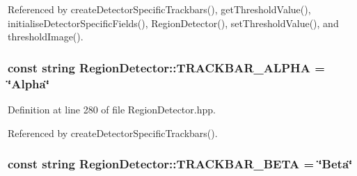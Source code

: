 \-Referenced by create\-Detector\-Specific\-Trackbars(), get\-Threshold\-Value(), initialise\-Detector\-Specific\-Fields(), \-Region\-Detector(), set\-Threshold\-Value(), and threshold\-Image().

\hypertarget{classmultiscale_1_1analysis_1_1RegionDetector_a5513e029d4d4cf249aa40364489f7a85}{
\subsubsection[{\-T\-R\-A\-C\-K\-B\-A\-R\-\_\-\-A\-L\-P\-H\-A}]{\setlength{\rightskip}{0pt plus 5cm}const string {\bf \-Region\-Detector\-::\-T\-R\-A\-C\-K\-B\-A\-R\-\_\-\-A\-L\-P\-H\-A} = \char`\"{}\-Alpha\char`\"{}}}\label{classmultiscale_1_1analysis_1_1RegionDetector_a5513e029d4d4cf249aa40364489f7a85}


\-Definition at line 280 of file \-Region\-Detector.\-hpp.



\-Referenced by create\-Detector\-Specific\-Trackbars().

\hypertarget{classmultiscale_1_1analysis_1_1RegionDetector_a79d7878ed55bf12a87637896a1f44e37}{
\subsubsection[{\-T\-R\-A\-C\-K\-B\-A\-R\-\_\-\-B\-E\-T\-A}]{\setlength{\rightskip}{0pt plus 5cm}const string {\bf \-Region\-Detector\-::\-T\-R\-A\-C\-K\-B\-A\-R\-\_\-\-B\-E\-T\-A} = \char`\"{}\-Beta\char`\"{}}}\label{classmultiscale_1_1analysis_1_1RegionDetector_a79d7878ed55bf12a87637896a1f44e37}


